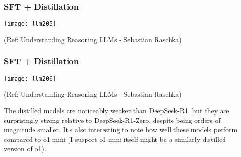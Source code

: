 \begin{frame}[fragile]\frametitle{SFT + Distillation}

  
  		\begin{center}
		\texttt{[image: llm205]}
		
		{\tiny (Ref: Understanding Reasoning LLMs - Sebastian Raschka)}

		\end{center}

\end{frame}

\begin{frame}[fragile]\frametitle{SFT + Distillation}

  
  		\begin{center}
		\texttt{[image: llm206]}
		
		{\tiny (Ref: Understanding Reasoning LLMs - Sebastian Raschka)}

		\end{center}
		
The distilled models are noticeably weaker than DeepSeek-R1, but they are surprisingly strong relative to DeepSeek-R1-Zero, despite being orders of magnitude smaller. It’s also interesting to note how well these models perform compared to o1 mini (I suspect o1-mini itself might be a similarly distilled version of o1).		

\end{frame}


		
		

  


